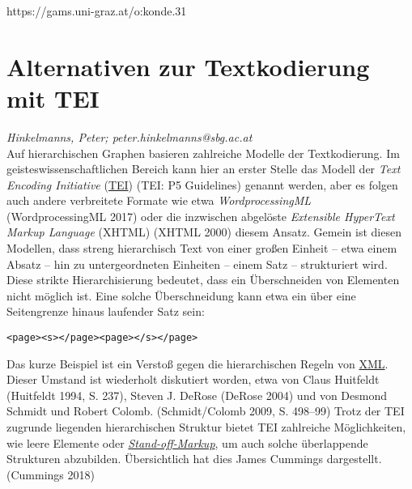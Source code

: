 \documentclass{article}
\begin{document}
https://gams.uni-graz.at/o:konde.31\newpage\section*{Alternativen zur Textkodierung mit TEI} \emph{Hinkelmanns, Peter; peter.hinkelmanns@sbg.ac.at }\\
        
    Auf hierarchischen Graphen basieren zahlreiche Modelle der Textkodierung. Im
                  geisteswissenschaftlichen Bereich kann hier an erster Stelle das Modell der \emph{Text Encoding Initiative} (\href{http://gams.uni-graz.at/o:konde.178}{TEI}) (TEI: P5 Guidelines) genannt
                  werden, aber es folgen auch andere verbreitete Formate wie etwa \emph{WordprocessingML }(WordprocessingML 2017) oder die inzwischen abgelöste \emph{Extensible HyperText Markup Language} (XHTML) (XHTML
                     2000) diesem Ansatz. Gemein ist diesen Modellen, dass streng
                  hierarchisch Text von einer großen Einheit – etwa einem Absatz – hin zu
                  untergeordneten Einheiten – einem Satz – strukturiert wird.\\
            
        Diese strikte Hierarchisierung bedeutet, dass ein Überschneiden von Elementen
                  nicht möglich ist. Eine solche Überschneidung kann etwa ein über eine Seitengrenze
                  hinaus laufender Satz sein:\\
            
        \begin{verbatim}<page><s></page><page></s></page>\end{verbatim}Das kurze Beispiel ist ein Verstoß gegen die hierarchischen Regeln von \href{http://gams.uni-graz.at/o:konde.215}{XML}. Dieser Umstand ist wiederholt
                  diskutiert worden, etwa von Claus Huitfeldt (Huitfeldt 1994, S. 237),
                  Steven J. DeRose (DeRose 2004) und von Desmond Schmidt und Robert
                  Colomb. (Schmidt/Colomb 2009, S. 498–99) Trotz der TEI zugrunde
                  liegenden hierarchischen Struktur bietet TEI zahlreiche Möglichkeiten, wie leere
                  Elemente oder \emph{\href{http://gams.uni-graz.at/o:konde.171}{Stand-off-Markup}}, um auch solche überlappende Strukturen abzubilden. Übersichtlich hat dies
                  James Cummings dargestellt. (Cummings 2018)\\
            
\end{document}
